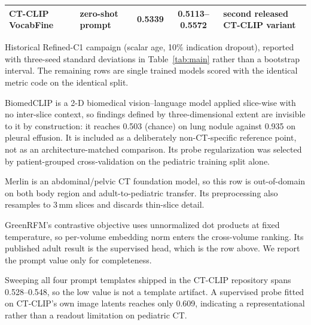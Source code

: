 \documentclass[10pt,twocolumn]{article}
\begin{document}
\begin{table}[t]
\begin{threeparttable}
\begin{tabular}{@{}llccp{4.6cm}@{}}
CT-CLIP VocabFine & zero-shot prompt & 0.5339 & 0.5113--0.5572 & second released CT-CLIP variant\tnote{e} \\
\bottomrule
\end{tabular}
\begin{tablenotes}[flushleft]\footnotesize
\item[a] Historical Refined-C1 campaign (scalar age, 10\% indication dropout),
reported with three-seed standard deviations in Table~\ref{tab:main} rather
than a bootstrap interval. The remaining rows are single trained models scored
with the identical metric code on the identical split.
\item[b] BiomedCLIP is a 2-D biomedical vision--language model applied
slice-wise with no inter-slice context, so findings defined by
three-dimensional extent are invisible to it by construction: it reaches 0.503
(chance) on lung nodule against 0.935 on pleural effusion. It is included as a
deliberately non-CT-specific reference point, not as an architecture-matched
comparison. Its probe regularization was selected by patient-grouped
cross-validation on the pediatric training split alone.
\item[c] Merlin is an abdominal/pelvic CT foundation model, so this row is
out-of-domain on both body region and adult-to-pediatric transfer. Its
preprocessing also resamples to 3\,mm slices and discards thin-slice detail.
\item[d] GreenRFM's contrastive objective uses unnormalized dot products at
fixed temperature, so per-volume embedding norm enters the cross-volume
ranking. Its published adult result is the supervised head, which is the row
above. We report the prompt value only for completeness.
\item[e] Sweeping all four prompt templates shipped in the CT-CLIP repository
spans 0.528--0.548, so the low value is not a template artifact. A supervised
probe fitted on CT-CLIP's own image latents reaches only 0.609, indicating a
representational rather than a readout limitation on pediatric CT.
\end{tablenotes}
\end{threeparttable}
\end{table}
\end{document}
